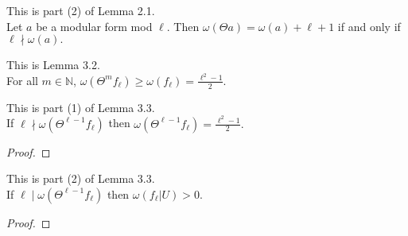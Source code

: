 \begin{theorem}
  \label{thm:Filt_Theta_iff}
  \leanok
  This is part (2) of Lemma 2.1. \\
  Let $a$ be a modular form mod $\ell$. Then $\omega (\Theta a) = \omega (a) + \ell + 1$ 
  if and only if $\ell \nmid \omega (a).$
\end{theorem}

\begin{theorem}
  \label{thm:le_Filt_Theta_fl}
  \leanok
  This is Lemma 3.2. \\
  For all $m \in \mathbb{N}$, $\omega (\Theta^m f_\ell) \ge \omega (f_\ell) = \frac{\ell^2 - 1}{2}.$
\end{theorem} 


\begin{theorem}
  \label{thm:Filt_Theta_pow_l_sub_one} 
  \leanok
  This is part (1) of Lemma 3.3. \\
  If $\ell \nmid \omega (\Theta^{\ell - 1} f_\ell)$ then 
  $\omega (\Theta^{\ell - 1} f_\ell) = \frac{\ell^2 - 1}{2}.$
\end{theorem}
\begin{proof}
  \leanok
\end{proof}

\begin{theorem}
  \label{thm:Filt_U_pos}
  \leanok
  This is part (2) of Lemma 3.3. \\
  If $\ell \mid \omega (\Theta^{\ell - 1} f_\ell)$ then 
  $\omega (f_\ell | U) > 0$.
\end{theorem}
\begin{proof}
  \leanok
\end{proof}
